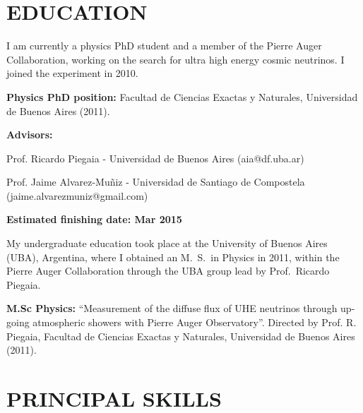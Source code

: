 \documentclass[letterpaper]{article}
\renewenvironment{itemize}{
  \begin{list}{}{
    \setlength{\leftmargin}{1.5em}
  }
}{
  \end{list}
}
\begin{document}
\section*{EDUCATION}
I am currently a physics PhD student and a member of the Pierre Auger Collaboration, working on the search for ultra high energy cosmic neutrinos. I joined the experiment in 2010.
\begin{itemize}
 \item \textbf{Physics PhD position:} Facultad de Ciencias Exactas y Naturales, Universidad de Buenos Aires (2011).
 \item \textbf{Advisors:}
 \begin{itemize}
  \item Prof. Ricardo Piegaia - Universidad de Buenos Aires (aia@df.uba.ar) 
  \item Prof. Jaime Alvarez-Mu\~niz - Universidad de Santiago de Compostela (jaime.alvarezmuniz@gmail.com)
 \end{itemize}
 \item \textbf{Estimated finishing date: Mar 2015}
\end{itemize}
 
My undergraduate education took place at the University of Buenos Aires (UBA), Argentina, where I obtained an M.\ S.\ in Physics in 2011, within the Pierre Auger Collaboration through the UBA group lead by Prof.\ Ricardo Piegaia.
%
\begin{itemize}
 \item \textbf{M.Sc Physics:} ``Measurement of the diffuse flux of UHE neutrinos through up-going atmospheric showers with Pierre Auger Observatory''. Directed by Prof. R. Piegaia, Facultad de Ciencias Exactas y Naturales, Universidad de Buenos Aires (2011).
\end{itemize}
 
\section*{PRINCIPAL SKILLS}

\end{document}
